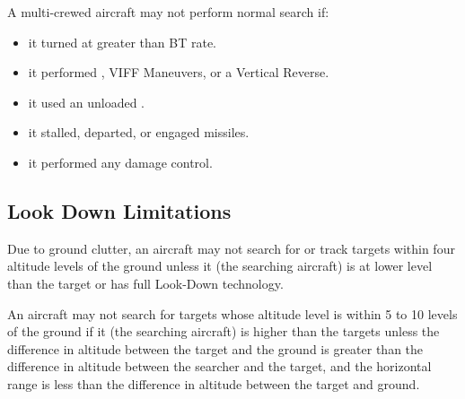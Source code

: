 A multi-crewed aircraft may not perform normal search if:

\begin{itemize}

    \item it turned at greater than BT rate.

    \item it performed , VIFF Maneuvers, or a Vertical Reverse.

    \item it used an unloaded .


    \item it stalled, departed, or engaged missiles.


    \item it performed any damage control.


\end{itemize}


\subsection{Look Down Limitations} \label{rule:radar-ground-clutter} Due to ground clutter, an aircraft may not search for or track targets within four altitude levels of the ground unless it (the searching aircraft) is at lower level than the target or has full Look-Down technology.

An aircraft may not search for targets whose altitude level is within 5 to 10 levels of the ground if it (the searching aircraft) is higher than the targets unless the difference in altitude between the target and the ground is greater than the difference in altitude between the searcher and the target, and the horizontal range is less than the difference in altitude between the target and ground.

